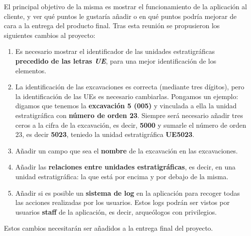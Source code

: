 El principal objetivo de la misma es mostrar el funcionamiento de la aplicación al cliente, y
ver qué puntos le gustaría añadir o en qué puntos podría mejorar de cara a la entrega del
producto final. Tras esta reunión se propusieron los siguientes cambios al proyecto:

    \begin{enumerate}
        \item Es necesario mostrar el identificador de las unidades estratigráficas
        \textbf{precedido de las letras \textit{UE}}, para una mejor identificación de los
        elementos.
        \item La identificación de las excavaciones es correcta (mediante tres dígitos),
        pero la identificación de las UEs es necesario cambiarlas. Pongamos un ejemplo:
        digamos que tenemos la \textbf{excavación 5 (005)} y vinculada a ella la unidad
        estratigráfica con \textbf{número de orden 23}. Siempre será necesario añadir tres
        ceros a la cifra de la excavación, es decir, \textbf{5000} y sumarle el número de
        orden 23, es decir \textbf{5023}, teniedo la unidad estratigráfica \textbf{UE5023}.
        \item Añadir un campo que sea el \textbf{nombre} de la excavación en las
        excavaciones.
        \item Añadir las \textbf{relaciones entre unidades estratigráficas}, es decir, en una
        unidad estratigráfica: la que está por encima y por debajo de la misma.
        \item Añadir si es posible un \textbf{sistema de log} en la aplicación para recoger
        todas las acciones realizadas por los usuarios. Estos logs podrán ser vistos por
        usuarios \textbf{staff} de la aplicación, es decir, arqueólogos con privilegios.
    \end{enumerate}

Estos cambios necesitarán ser añadidos a la entrega final del proyecto.
